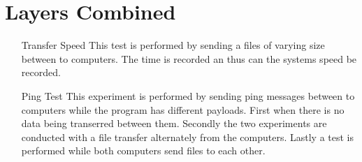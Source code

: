 \section{Layers Combined}

\begin{itemize}
\item[Transfer Speed] This test is performed by sending a files of varying size between to computers. The time is recorded an thus can the systems speed be recorded.
\item[Ping Test] This experiment is performed by sending ping messages between to computers while the program has different payloads. First when there is no data being transerred between them. Secondly the two experiments are conducted with a file transfer alternately from the computers. Lastly a test is performed while both computers send files to each other.  
\end{itemize}
